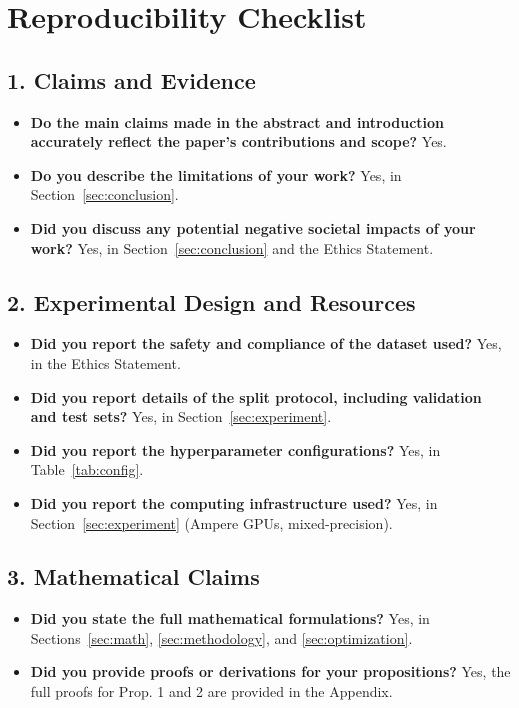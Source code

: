 \documentclass[letterpaper]{article} %
\begin{document}



\section*{Reproducibility Checklist}

\subsection*{1. Claims and Evidence}
\begin{itemize}
    \item \textbf{Do the main claims made in the abstract and introduction accurately reflect the paper's contributions and scope?} Yes.
    \item \textbf{Do you describe the limitations of your work?} Yes, in Section~\ref{sec:conclusion}.
    \item \textbf{Did you discuss any potential negative societal impacts of your work?} Yes, in Section~\ref{sec:conclusion} and the Ethics Statement.
\end{itemize}

\subsection*{2. Experimental Design and Resources}
\begin{itemize}
    \item \textbf{Did you report the safety and compliance of the dataset used?} Yes, in the Ethics Statement.
    \item \textbf{Did you report details of the split protocol, including validation and test sets?} Yes, in Section~\ref{sec:experiment}.
    \item \textbf{Did you report the hyperparameter configurations?} Yes, in Table~\ref{tab:config}.
    \item \textbf{Did you report the computing infrastructure used?} Yes, in Section~\ref{sec:experiment} (Ampere GPUs, mixed-precision).
\end{itemize}

\subsection*{3. Mathematical Claims}
\begin{itemize}
    \item \textbf{Did you state the full mathematical formulations?} Yes, in Sections~\ref{sec:math}, \ref{sec:methodology}, and \ref{sec:optimization}.
    \item \textbf{Did you provide proofs or derivations for your propositions?} Yes, the full proofs for Prop. 1 and 2 are provided in the Appendix.
\end{itemize}
\end{document}
